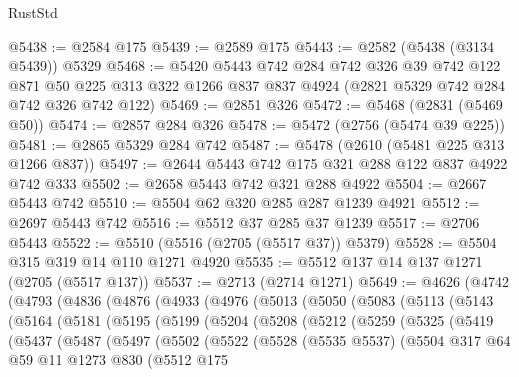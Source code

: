 \begin{lexlean}{RustStd}
\begin{coremodule}
@5438 := @2584 @175
@5439 := @2589 @175
@5443 := @2582 (@5438 (@3134 @5439)) @5329
@5468 := @5420
    @5443
    @742
    @284
    @742
    @326
    @39
    @742
    @122
    @871
    @50
    @225
    @313
    @322
    @1266
    @837
    @837
    @4924
    (@2821 @5329 @742 @284 @742 @326 @742 @122)
@5469 := @2851 @326
@5472 := @5468 (@2831 (@5469 @50))
@5474 := @2857 @284 @326
@5478 := @5472 (@2756 (@5474 @39 @225))
@5481 := @2865 @5329 @284 @742
@5487 := @5478 (@2610 (@5481 @225 @313 @1266 @837))
@5497 := @2644 @5443 @742 @175 @321 @288 @122 @837 @4922 @742 @333
@5502 := @2658 @5443 @742 @321 @288 @4922
@5504 := @2667 @5443 @742
@5510 := @5504 @62 @320 @285 @287 @1239 @4921
@5512 := @2697 @5443 @742
@5516 := @5512 @37 @285 @37 @1239
@5517 := @2706 @5443
@5522 := @5510 (@5516 (@2705 (@5517 @37)) @5379)
@5528 := @5504 @315 @319 @14 @110 @1271 @4920
@5535 := @5512 @137 @14 @137 @1271 (@2705 (@5517 @137))
@5537 := @2713 (@2714 @1271)
@5649 := @4626
    (@4742
      (@4793
        (@4836
          (@4876
            (@4933
              (@4976
                (@5013
                  (@5050
                    (@5083
                      (@5113
                        (@5143
                          (@5164
                            (@5181
                              (@5195
                                (@5199
                                  (@5204
                                    (@5208
                                      (@5212
                                        (@5259
                                          (@5325
                                            (@5419
                                              (@5437
                                                (@5487
                                                  (@5497
                                                    (@5502
                                                      (@5522
                                                        (@5528
                                                          (@5535 @5537)
                                                          (@5504
                                                            @317
                                                            @64
                                                            @59
                                                            @11
                                                            @1273
                                                            @830
                                                            (@5512
                                                              @175

\end{coremodule}
\end{lexlean}
